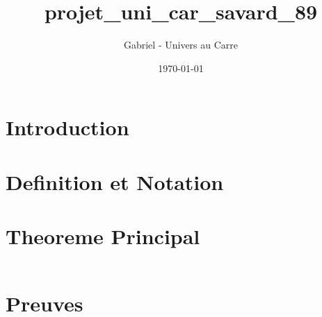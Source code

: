 \documentclass[12pt]{article}
\title{projet_uni_car_savard_89}
\author{Gabriel - Univers au Carre}
\date{\today}
\begin{document}
\maketitle


\section{Introduction}



\section{Definition et Notation}



\section{Theoreme Principal}


\begin{equation}
\end{equation}


\section{Preuves}


\end{document}
